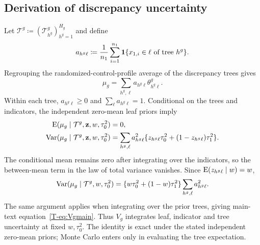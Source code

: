 \subsection{Derivation of discrepancy uncertainty}\label{sec:B.3}
Let $\mathcal T^g\coloneqq(\mathcal T_{h^g}^g)_{h^g=1}^{H_g}$ and define
\begin{equation}\label{eq:weights}
a_{h^g\ell}\coloneqq
\frac1{n_{1}}\sum_{i=1}^{n_{1}}
\mathbf{1}\{x_{1,i}\in\ell\text{ of tree }h^g\}.
\end{equation}
Regrouping the randomized-control-profile average of the discrepancy trees gives
\begin{equation}
\mu_g=\sum_{h^g,\ell}a_{h^g\ell}\theta^g_{h^g\ell}.
\end{equation}
Within each tree, $a_{h^g\ell}\geq0$ and $\sum_\ell a_{h^g\ell}=1$. Conditional on the trees and indicators, the independent zero-mean leaf priors imply
\begin{equation}\label{eq:conditionalVg}
\begin{aligned}
\operatorname{E}(\mu_g\mid\mathcal T^g,\mathbf z,w,\tau_0^2)&=0,\\
\operatorname{Var}(\mu_g\mid\mathcal T^g,\mathbf z,w,\tau_0^2)
&=\sum_{h^g,\ell}a_{h^g\ell}^2
\{z_{h^g\ell}\tau_0^2+(1-z_{h^g\ell})\tau_1^2\}.
\end{aligned}
\end{equation}
The conditional mean remains zero after integrating over the indicators, so the between-mean term in the law of total variance vanishes. Since $\operatorname{E}(z_{h^g\ell}\mid w)=w$,
\[
\operatorname{Var}(\mu_g\mid\mathcal T^g,w,\tau_0^2)
=\{w\tau_0^2+(1-w)\tau_1^2\}
\sum_{h^g,\ell}a_{h^g\ell}^2.
\]
The same argument applies when integrating over the prior trees, giving main-text equation~\ref{T-eq:Vgmain}. Thus $V_g$ integrates leaf, indicator and tree uncertainty at fixed $w,\tau_0^2$. The identity is exact under the stated independent zero-mean priors; Monte Carlo enters only in evaluating the tree expectation.

